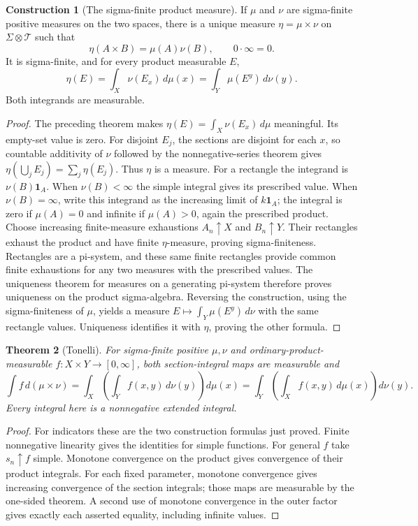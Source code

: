 \documentclass[11pt,oneside,openany]{book}
\newtheorem{theorem}{Theorem}[chapter]
\theoremstyle{definition}
\newtheorem{construction}[theorem]{Construction}
\theoremstyle{remark}
\newcommand{\one}{\mathbf1}\newcommand{\ind}[1]{\mathbf1_{#1}}
\newcommand{\Eplus}{[0,\infty]}
\newcommand{\family}[1]{}
\begin{document}
\begin{construction}[The sigma-finite product measure]
\family{D11.08.product_measure}\label{d11:08:product-measure}
If $\mu$ and $\nu$ are sigma-finite positive measures on the two spaces,
there is a unique measure $\eta=\mu\times\nu$ on
$\Sigma\otimes\mathcal T$ such that
\[
 \eta(A\times B)=\mu(A)\nu(B),\qquad0\cdot\infty=0.
\]
It is sigma-finite, and for every product measurable $E$,
\[
 \eta(E)=\int_X\nu(E_x)\,d\mu(x)
        =\int_Y\mu(E^y)\,d\nu(y).
\]
Both integrands are measurable.
\end{construction}
\begin{proof}
The preceding theorem makes
$\eta(E)=\int_X\nu(E_x)\,d\mu$ meaningful. Its empty-set value is zero.
For disjoint $E_j$, the sections are disjoint for each $x$, so countable
additivity of $\nu$ followed by the nonnegative-series theorem gives
$\eta(\bigcup_jE_j)=\sum_j\eta(E_j)$. Thus $\eta$ is a measure.
For a rectangle the integrand is $\nu(B)\one_A$. When $\nu(B)<\infty$
the simple integral gives its prescribed value. When $\nu(B)=\infty$,
write this integrand as the increasing limit of $k\one_A$; the integral
is zero if $\mu(A)=0$ and infinite if $\mu(A)>0$, again the prescribed
product. Choose increasing finite-measure exhaustions $A_n\uparrow X$
and $B_n\uparrow Y$. Their rectangles exhaust the product and have
finite $\eta$-measure, proving sigma-finiteness.
Rectangles are a pi-system, and these same finite rectangles provide
common finite exhaustions for any two measures with the prescribed
values. The uniqueness theorem for measures on a generating pi-system
therefore proves uniqueness on the product sigma-algebra. Reversing the
construction, using the sigma-finiteness of $\mu$, yields a measure
$E\mapsto\int_Y\mu(E^y)\,d\nu$ with the same rectangle values. Uniqueness
identifies it with $\eta$, proving the other formula.
\end{proof}

\begin{theorem}[Tonelli]
\family{D11.08.tonelli}\label{d11:08:tonelli}
For sigma-finite positive $\mu,\nu$ and ordinary-product-measurable
$f:X\times Y\to\Eplus$, both section-integral maps are measurable and
\[
 \int f\,d(\mu\times\nu)
 =\int_X\left(\int_Y f(x,y)\,d\nu(y)\right)d\mu(x)
 =\int_Y\left(\int_X f(x,y)\,d\mu(x)\right)d\nu(y).
\]
Every integral here is a nonnegative extended integral.
\end{theorem}
\begin{proof}
For indicators these are the two construction formulas just proved.
Finite nonnegative linearity gives the identities for simple functions.
For general $f$ take $s_n\uparrow f$ simple. Monotone convergence on the
product gives convergence of their product integrals. For each fixed
parameter, monotone convergence gives increasing convergence of the
section integrals; those maps are measurable by the one-sided theorem.
A second use of monotone convergence in the outer factor gives exactly
each asserted equality, including infinite values.
\end{proof}
\end{document}
